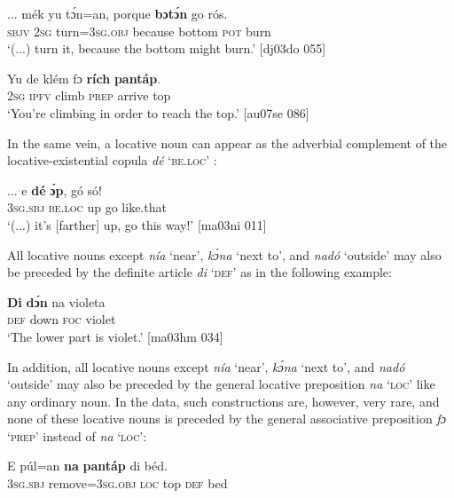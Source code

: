 \ea%
    \label{ex:key:910}
    \gll \op...\cp{}  mék    yu  tɔ́n=an,    porque  \textbf{bɔtɔ́n}  go  rós.\\
{}  \textsc{sbjv}    \textsc{2sg}  turn=\textsc{3sg.obj}  because  bottom  \textsc{pot}  burn\\

\glt ‘(...) turn it, because the bottom might burn.’ [dj03do 055]
\z


\ea%
    \label{ex:key:911}
    \gll Yu  de  klém  fɔ  \textbf{rích}    \textbf{pantáp}.\\
\textsc{2sg}  \textsc{ipfv}  climb  \textsc{prep}  arrive  top\\

\glt ‘You’re climbing in order to reach the top.’ [au07se 086]
\z

In the same vein, a locative noun can appear as the adverbial complement of the locative-existential copula \textit{dé} \textsc{‘be.loc’} :


\ea%
    \label{ex:key:912}
    \gll \op...\cp{}  e    \textbf{dé}    \textbf{ɔ́p},  gó  só!\\
{}  \textsc{3sg.sbj}  \textsc{be.loc}  up  go  like.that\\

\glt ‘(...) it’s [farther] up, go this way!’ [ma03ni 011]
\z

All locative nouns except \textit{nía} ‘near’, \textit{kɔ́na} ‘next to’, and \textit{nadó} ‘outside’ may also be preceded by the definite article \textit{di} ‘\textsc{def}’ as in the following example: 


\ea%
    \label{ex:key:913}
    \gll \textbf{Di}  \textbf{dɔ́n}    na  violeta\\
 \textsc{def}  down  \textsc{foc}  violet\\

\glt ‘The lower part is violet.’ [ma03hm 034]\\
\z

In addition, all locative nouns except \textit{nía} ‘near’, \textit{kɔ́na} ‘next to’, and \textit{nadó} ‘outside’ may also be preceded by the general locative preposition \textit{na} ‘\textsc{loc}’ like any ordinary noun. In the data, such constructions are, however, very rare, and none of these locative nouns is preceded by the general associative preposition \textit{fɔ} ‘\textsc{prep}’ instead of \textit{na} ‘\textsc{loc}’: 


\ea%
    \label{ex:key:914}
    \gll E    púl=an      \textbf{na}  \textbf{pantáp}  di  béd.\\
\textsc{3sg.sbj}  remove=\textsc{3sg.obj}  \textsc{loc}  top    \textsc{def}  bed\\


